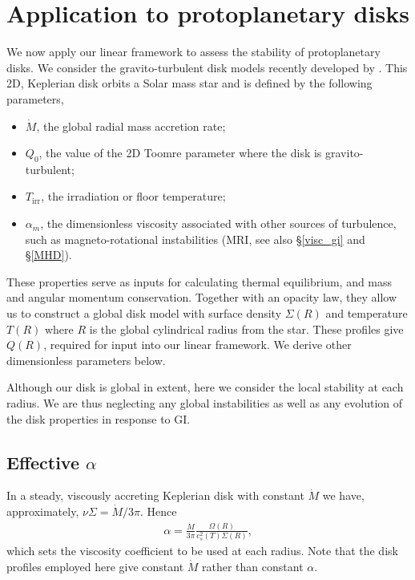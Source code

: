 \section{Application to protoplanetary disks}\label{2dppd}
We now apply our linear framework to assess the stability of  
protoplanetary disks. We consider the gravito-turbulent disk models recently
developed by \citet[][hereafter ]{rafikov15}. 
This 2D, Keplerian disk orbits a Solar 
mass star and is defined by the following parameters, 

\begin{itemize}
  \item $\dot{M}$, the global radial mass accretion rate;
  \item $Q_0$, the value of the 2D Toomre parameter where the disk is
    gravito-turbulent;
  \item $T_\mathrm{irr}$, the irradiation or floor temperature;
  \item $\alpha_m$, the dimensionless viscosity associated with other
    sources of turbulence, such as magneto-rotational instabilities
    (MRI, see also \S\ref{visc_gi} and \S\ref{MHD}). 
\end{itemize} 
These properties serve as inputs for calculating thermal equilibrium, and mass and
angular momentum conservation. Together with an opacity law, 
they allow us to construct a global disk model with surface density $\Sigma(R)$ and
temperature $T(R)$ where $R$ is the global cylindrical radius from the
star.  These profiles give $Q(R)$,
required for input into our linear framework. We derive other
dimensionless parameters below. 

Although our disk is global in extent, here we consider the local
stability at each radius. We are thus neglecting any global
instabilities \citep{adams89,lodato05,kratter10} as well as any
evolution of the disk properties in response to GI. 
 

\subsection{Effective $\alpha$}
In a steady, viscously accreting Keplerian disk 
with constant $\dot{M}$ we have,
approximately, $\nu\Sigma = \dot{M}/3\pi$. Hence
\begin{align}
  \alpha = \frac{\dot{M}}{3\pi}\frac{\Omega(R)}{c_{s}^2(T)\Sigma(R)},  
\end{align} 
which sets the viscosity coefficient to be used at each radius. Note that the disk profiles 
employed here give constant $\dot{M}$ rather than constant $\alpha$.

